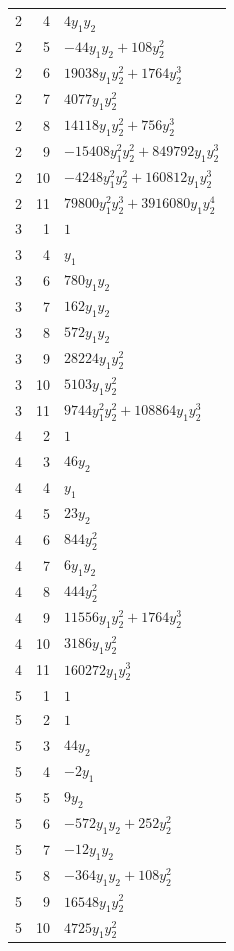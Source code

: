 \documentclass[10pt,a4paper]{article}
\begin{document}
{\begin{longtable}{rrp{125mm}}
2 & 4 & $4 y_{1} y_{2}$\\
2 & 5 & $- 44 y_{1} y_{2} + 108 y_{2}^{2}$\\
2 & 6 & $19038 y_{1} y_{2}^{2} + 1764 y_{2}^{3}$\\
2 & 7 & $4077 y_{1} y_{2}^{2}$\\
2 & 8 & $14118 y_{1} y_{2}^{2} + 756 y_{2}^{3}$\\
2 & 9 & $- 15408 y_{1}^{2} y_{2}^{2} + 849792 y_{1} y_{2}^{3}$\\
2 & 10 & $- 4248 y_{1}^{2} y_{2}^{2} + 160812 y_{1} y_{2}^{3}$\\
2 & 11 & $79800 y_{1}^{2} y_{2}^{3} + 3916080 y_{1} y_{2}^{4}$\\
3 & 1 & $1$\\
3 & 4 & $y_{1}$\\
3 & 6 & $780 y_{1} y_{2}$\\
3 & 7 & $162 y_{1} y_{2}$\\
3 & 8 & $572 y_{1} y_{2}$\\
3 & 9 & $28224 y_{1} y_{2}^{2}$\\
3 & 10 & $5103 y_{1} y_{2}^{2}$\\
3 & 11 & $9744 y_{1}^{2} y_{2}^{2} + 108864 y_{1} y_{2}^{3}$\\
4 & 2 & $1$\\
4 & 3 & $46 y_{2}$\\
4 & 4 & $y_{1}$\\
4 & 5 & $23 y_{2}$\\
4 & 6 & $844 y_{2}^{2}$\\
4 & 7 & $6 y_{1} y_{2}$\\
4 & 8 & $444 y_{2}^{2}$\\
4 & 9 & $11556 y_{1} y_{2}^{2} + 1764 y_{2}^{3}$\\
4 & 10 & $3186 y_{1} y_{2}^{2}$\\
4 & 11 & $160272 y_{1} y_{2}^{3}$\\
5 & 1 & $1$\\
5 & 2 & $1$\\
5 & 3 & $44 y_{2}$\\
5 & 4 & $- 2 y_{1}$\\
5 & 5 & $9 y_{2}$\\
5 & 6 & $- 572 y_{1} y_{2} + 252 y_{2}^{2}$\\
5 & 7 & $- 12 y_{1} y_{2}$\\
5 & 8 & $- 364 y_{1} y_{2} + 108 y_{2}^{2}$\\
5 & 9 & $16548 y_{1} y_{2}^{2}$\\
5 & 10 & $4725 y_{1} y_{2}^{2}$\\

\end{longtable}}
\end{document}
